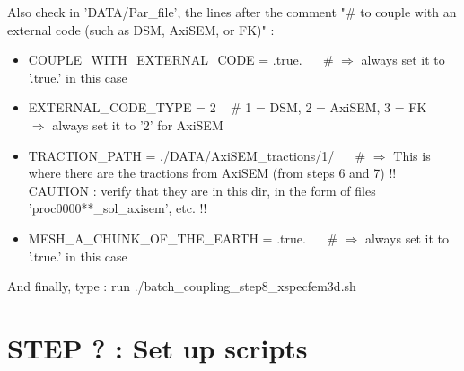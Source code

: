 \documentclass[11pt]{article}
\begin{document}
\medskip 

\noindent Also check in 'DATA/Par\_file', the lines after the comment "\# to couple with an external code (such as DSM, AxiSEM, or FK)" :

\begin{itemize}

\item[\textbullet] COUPLE\_WITH\_EXTERNAL\_CODE = .true. ~~ \# $\Longrightarrow$ always set it to '.true.' in this case

\item[\textbullet] EXTERNAL\_CODE\_TYPE = 2  ~ \# 1 = DSM, 2 = AxiSEM, 3 = FK ~~ $\Longrightarrow$ always set it to '2' for AxiSEM

\item[\textbullet] TRACTION\_PATH  = ./DATA/AxiSEM\_tractions/1/ ~~   \# $\Longrightarrow$ This is where there are the tractions from AxiSEM (from steps 6 and 7) !! CAUTION : verify that they are in this dir, in the form of files 'proc0000**\_sol\_axisem', etc. !!

\item[\textbullet] MESH\_A\_CHUNK\_OF\_THE\_EARTH  = .true.  ~~  \# $\Longrightarrow$ always set it to '.true.' in this case

\end{itemize}

\medskip

\noindent And finally, type : run ./batch\_coupling\_step8\_xspecfem3d.sh

\section{STEP ? : Set up scripts}
\end{document}
